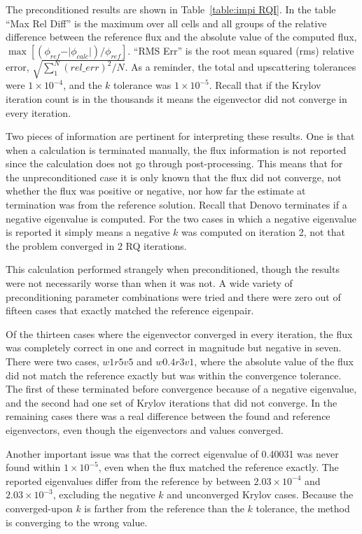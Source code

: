 %
The preconditioned results are shown in Table~\ref{table:impi RQI}. In the table ``Max Rel Diff'' is the maximum over all cells and all groups of the relative difference between the reference flux and the absolute value of the computed flux, $\max[ (\phi_{ref} - \vert\phi_{calc}\vert) / \phi_{ref}]$. ``RMS Err'' is the root mean squared (rms) relative error, $\sqrt{ \sum_{1}^{N}(rel\_err)^{2} / N}$. As a reminder, the total and upscattering tolerances were $1 \times 10^{-4}$, and the $k$ tolerance was $1 \times 10^{-5}$. Recall that if the Krylov iteration count is in the thousands it means the eigenvector did not converge in every iteration.

Two pieces of information are pertinent for interpreting these results. One is that when a calculation is terminated manually, the flux information is not reported since the calculation does not go through post-processing. This means that for the unpreconditioned case it is only known that the flux did not converge, not whether the flux was positive or negative, nor how far the estimate at termination was from the reference solution. Recall that Denovo terminates if a negative eigenvalue is computed. For the two cases in which a negative eigenvalue is reported it simply means a negative $k$ was computed on iteration 2, not that the problem converged in 2 RQ iterations. 

This calculation performed strangely when preconditioned, though the results were not necessarily worse than when it was not. A wide variety of preconditioning parameter combinations were tried and there were zero out of fifteen cases that exactly matched the reference eigenpair. 

Of the thirteen cases where the eigenvector converged in every iteration, the flux was completely correct in one and correct in magnitude but negative in seven. There were two cases, $w1r5v5$ and $w0.4r3v1$, where the absolute value of the flux did not match the reference exactly but was within the convergence tolerance. The first of these terminated before convergence because of a negative eigenvalue, and the second had one set of Krylov iterations that did not converge. In the remaining cases there was a real difference between the found and reference eigenvectors, even though the eigenvectors and values converged. 

Another important issue was that the correct eigenvalue of 0.40031 was never found within $1 \times 10^{-5}$, even when the flux matched the reference exactly. The reported eigenvalues differ from the reference by between $2.03 \times 10^{-4}$ and $2.03 \times 10^{-3}$, excluding the negative $k$ and unconverged Krylov cases. Because the converged-upon $k$ is farther from the reference than the $k$ tolerance, the method is converging to the wrong value. 

